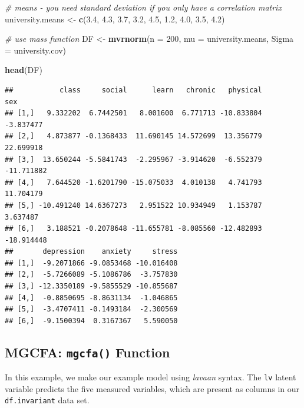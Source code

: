 \documentclass[
  man]{apa7}
\newenvironment{Shaded}{\begin{snugshade}}{\end{snugshade}}
\newcommand{\AttributeTok}[1]{\textcolor[rgb]{0.13,0.29,0.53}{#1}}
\newcommand{\CommentTok}[1]{\textcolor[rgb]{0.56,0.35,0.01}{\textit{#1}}}
\newcommand{\DecValTok}[1]{\textcolor[rgb]{0.00,0.00,0.81}{#1}}
\newcommand{\FloatTok}[1]{\textcolor[rgb]{0.00,0.00,0.81}{#1}}
\newcommand{\FunctionTok}[1]{\textcolor[rgb]{0.13,0.29,0.53}{\textbf{#1}}}
\newcommand{\NormalTok}[1]{#1}
\newcommand{\OtherTok}[1]{\textcolor[rgb]{0.56,0.35,0.01}{#1}}
\begin{document}
\begin{Shaded}
\begin{Highlighting}[]
\CommentTok{\# means {-} you need standard deviation if you only have a correlation matrix }
\NormalTok{university.means }\OtherTok{\textless{}{-}} \FunctionTok{c}\NormalTok{(}\FloatTok{3.4}\NormalTok{, }\FloatTok{4.3}\NormalTok{, }\FloatTok{3.7}\NormalTok{, }\FloatTok{3.2}\NormalTok{, }\FloatTok{4.5}\NormalTok{, }\FloatTok{1.2}\NormalTok{, }\FloatTok{4.0}\NormalTok{, }\FloatTok{3.5}\NormalTok{, }\FloatTok{4.2}\NormalTok{)}

\CommentTok{\# use mass function}
\NormalTok{DF }\OtherTok{\textless{}{-}} \FunctionTok{mvrnorm}\NormalTok{(}\AttributeTok{n =} \DecValTok{200}\NormalTok{, }\AttributeTok{mu =}\NormalTok{ university.means, }\AttributeTok{Sigma =}\NormalTok{ university.cov)}

\FunctionTok{head}\NormalTok{(DF)}
\end{Highlighting}
\end{Shaded}

\normalsize

\begin{verbatim}
##           class     social      learn   chronic   physical        sex
## [1,]   9.332202  6.7442501   8.001600  6.771713 -10.833804  -3.837477
## [2,]   4.873877 -0.1368433  11.690145 14.572699  13.356779  22.699918
## [3,]  13.650244 -5.5841743  -2.295967 -3.914620  -6.552379 -11.711882
## [4,]   7.644520 -1.6201790 -15.075033  4.010138   4.741793  11.704179
## [5,] -10.491240 14.6367273   2.951522 10.934949   1.153787   3.637487
## [6,]   3.188521 -0.2078648 -11.655781 -8.085560 -12.482893 -18.914448
##       depression    anxiety     stress
## [1,]  -9.2071866 -9.0853468 -10.016408
## [2,]  -5.7266089 -5.1086786  -3.757830
## [3,] -12.3350189 -9.5855529 -10.855687
## [4,]  -0.8850695 -8.8631134  -1.046865
## [5,]  -3.4707411 -0.1493184  -2.300569
## [6,]  -9.1500394  0.3167367   5.590050
\end{verbatim}

\newpage

\subsection{\texorpdfstring{MGCFA: \texttt{mgcfa()} Function}{MGCFA: mgcfa() Function}}\label{mgcfa-mgcfa-function-1}

In this example, we make our example model using \emph{lavaan} syntax. The \texttt{lv} latent variable predicts the five measured variables, which are present as columns in our \texttt{df.invariant} data set.
\end{document}
